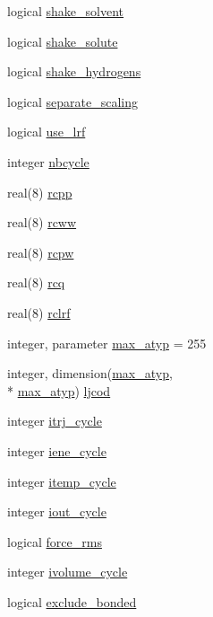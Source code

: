 \begin{DoxyCompactItemize}
logical \hyperlink{classmd_a7a7e6cd21f89e488161401317fd48560}{shake\-\_\-solvent}
\item 
logical \hyperlink{classmd_a4f71ea0c12f02331ebd77dba932134b5}{shake\-\_\-solute}
\item 
logical \hyperlink{classmd_a7b64b925ddde9dba048509b4f3cf9cd9}{shake\-\_\-hydrogens}
\item 
logical \hyperlink{classmd_af2cad0f016d5428317b00d47a28127f5}{separate\-\_\-scaling}
\item 
logical \hyperlink{classmd_a746711fa2c6f67487c451b41385fb71a}{use\-\_\-lrf}
\item 
integer \hyperlink{classmd_a1559f2bfe56403d7d3924e76f5f3e29f}{nbcycle}
\item 
real(8) \hyperlink{classmd_a24b5c26f2e0de9fdcad07aa77819b516}{rcpp}
\item 
real(8) \hyperlink{classmd_af0e149922fc555a967a6e9da995bb092}{rcww}
\item 
real(8) \hyperlink{classmd_ae677687763066409ae149979e9ba9bc3}{rcpw}
\item 
real(8) \hyperlink{classmd_a2482363af4bc9cded92dfecf1401df51}{rcq}
\item 
real(8) \hyperlink{classmd_a8713057e602313e4dd972ac22bbdbd97}{rclrf}
\item 
integer, parameter \hyperlink{classmd_a7f8aa5c2e75f9e30fdbf640c8e8fcfa3}{max\-\_\-atyp} = 255
\item 
integer, dimension(\hyperlink{classmd_a7f8aa5c2e75f9e30fdbf640c8e8fcfa3}{max\-\_\-atyp}, \\*
\hyperlink{classmd_a7f8aa5c2e75f9e30fdbf640c8e8fcfa3}{max\-\_\-atyp}) \hyperlink{classmd_abdc7289478bcb65503403779b47ccbc1}{ljcod}
\item 
integer \hyperlink{classmd_aafacc3d975864e8cf80ada72a98674f4}{itrj\-\_\-cycle}
\item 
integer \hyperlink{classmd_a087ee8ef5f74cad007aebaeb7220ff40}{iene\-\_\-cycle}
\item 
integer \hyperlink{classmd_afcf5d82cba5392d79192e160903a14d1}{itemp\-\_\-cycle}
\item 
integer \hyperlink{classmd_a1d5559ffcfeaa5988f934be02bedbf7d}{iout\-\_\-cycle}
\item 
logical \hyperlink{classmd_ae40f56bdbbd45c9779f92082c633b1dc}{force\-\_\-rms}
\item 
integer \hyperlink{classmd_a49114a8929e898075ccda1f194d25272}{ivolume\-\_\-cycle}
\item 
logical \hyperlink{classmd_ab338c93b4ea945b578d0e170a83584a9}{exclude\-\_\-bonded}

\end{DoxyCompactItemize}
